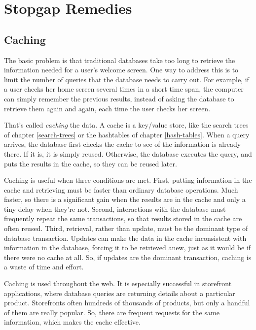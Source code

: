 \section{Stopgap Remedies}

\subsection{Caching}

The basic problem is that traditional databases take too long to retrieve the information needed for
a user's welcome screen.  One way to address this is to limit the number of queries that the
database needs to carry out.  
For example, if a user checks her home screen several times in a short time span,
the computer can simply remember the previous results, instead of asking the database to
retrieve them again and again, each time the user checks her screen.

That's called \emph{caching} the data.  A cache is a key/value store, like the search trees of chapter \ref{search-trees} or the hashtables of chapter \ref{hash-tables}.
When a query arrives, the database first checks the cache to see of the information is already there.
If it is, it is simply reused.  Otherwise, the database executes the query,
and puts the results in the cache, so they can be reused later.

Caching is useful when three conditions are met.  
First, putting information in the cache and retrieving must be faster than ordinary database operations. 
Much faster, so there is a significant gain when the results are in the cache and only a tiny delay
when they're not.  Second, interactions with the database must frequently repeat the same transactions,
so that results stored in the cache are often reused.  
Third, retrieval, rather than update, must be the dominant type of database transaction.
Updates can make the data in the cache inconsistent with information in the database,
forcing it to be retrieved anew, just as it would be if there were no cache at all.
So, if updates are the dominant transaction, caching is a waste of time and effort.

Caching is used throughout the web.  It is especially successful in storefront applications, where
database queries are returning details about a particular product.  
Storefronts often hundreds of thousands of products,
but only a handful of them are really popular.
So, there are frequent requests for the same information, which makes the cache effective.

